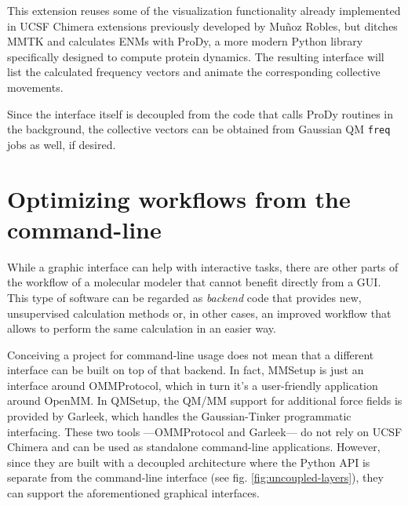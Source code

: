 This extension reuses some of the visualization functionality already implemented in UCSF Chimera extensions previously developed by Muñoz Robles,\cite{MunozRobles2014a} but ditches MMTK\cite{mmtk} and calculates ENMs with ProDy,\cite{prody} a more modern Python library specifically designed to compute protein dynamics. The resulting interface will list the calculated frequency vectors and animate the corresponding collective movements.

Since the interface itself is decoupled from the code that calls ProDy routines in the background, the collective vectors can be obtained from Gaussian QM \texttt{freq} jobs as well, if desired.


\section{Optimizing workflows from the command-line}
While a graphic interface can help with interactive tasks, there are other parts of the workflow of a molecular modeler that cannot benefit directly from a GUI. This type of software can be regarded as \textit{backend} code that provides new, unsupervised calculation methods or, in other cases, an improved workflow that allows to perform the same calculation in an easier way.

Conceiving a project for command-line usage does not mean that a different interface can be built on top of that backend. In fact, MMSetup is just an interface around OMMProtocol, which in turn it's a user-friendly application around OpenMM. In QMSetup, the QM/MM support for additional force fields is provided by Garleek, which handles the Gaussian-Tinker programmatic interfacing. These two tools ---OMMProtocol and Garleek--- do not rely on UCSF Chimera and can be used as standalone command-line applications. However, since they are built with a decoupled architecture where the Python API is separate from the command-line interface (see fig. \ref{fig:uncoupled-layers}), they can support the aforementioned graphical interfaces.

